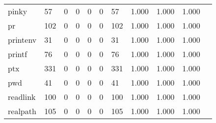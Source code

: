 \begin{longtable}{lp{1.10cm}p{1.10cm}p{1.10cm}p{1.10cm}p{1.10cm}p{1.10cm}p{1.10cm}p{1.10cm}p{1.10cm}p{1.10cm}}
pinky     &                     57 &                                  0 &                                 0 &                                0 &                                 0 &                              57 &                          1.000 &                                 1.000 &                               1.000 \\
pr        &                    102 &                                  0 &                                 0 &                                0 &                                 0 &                             102 &                          1.000 &                                 1.000 &                               1.000 \\
printenv  &                     31 &                                  0 &                                 0 &                                0 &                                 0 &                              31 &                          1.000 &                                 1.000 &                               1.000 \\
printf    &                     76 &                                  0 &                                 0 &                                0 &                                 0 &                              76 &                          1.000 &                                 1.000 &                               1.000 \\
ptx       &                    331 &                                  0 &                                 0 &                                0 &                                 0 &                             331 &                          1.000 &                                 1.000 &                               1.000 \\
pwd       &                     41 &                                  0 &                                 0 &                                0 &                                 0 &                              41 &                          1.000 &                                 1.000 &                               1.000 \\
readlink  &                    100 &                                  0 &                                 0 &                                0 &                                 0 &                             100 &                          1.000 &                                 1.000 &                               1.000 \\
realpath  &                    105 &                                  0 &                                 0 &                                0 &                                 0 &                             105 &                          1.000 &                                 1.000 &                               1.000 \\

\end{longtable}
